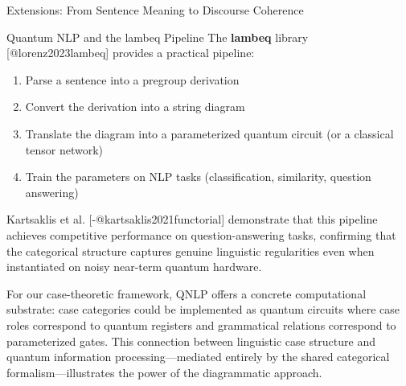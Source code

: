 \documentclass[
  ignorenonframetext,
]{beamer}
\providecommand{\tightlist}{%
  \setlength{\itemsep}{0pt}\setlength{\parskip}{0pt}}
\begin{document}
\begin{frame}{Extensions: From Sentence Meaning to Discourse Coherence}
\begin{block}{Quantum NLP and the lambeq Pipeline}
The \textbf{lambeq} library {[}@lorenz2023lambeq{]} provides a practical
pipeline:

\begin{enumerate}
\tightlist
\item
  Parse a sentence into a pregroup derivation
\item
  Convert the derivation into a string diagram
\item
  Translate the diagram into a parameterized quantum circuit (or a
  classical tensor network)
\item
  Train the parameters on NLP tasks (classification, similarity,
  question answering)
\end{enumerate}

Kartsaklis et al. {[}-@kartsaklis2021functorial{]} demonstrate that this
pipeline achieves competitive performance on question-answering tasks,
confirming that the categorical structure captures genuine linguistic
regularities even when instantiated on noisy near-term quantum hardware.

For our case-theoretic framework, QNLP offers a concrete computational
substrate: case categories could be implemented as quantum circuits
where case roles correspond to quantum registers and grammatical
relations correspond to parameterized gates. This connection between
linguistic case structure and quantum information processing---mediated
entirely by the shared categorical formalism---illustrates the power of
the diagrammatic approach.
\end{block}
\end{frame}
\end{document}
